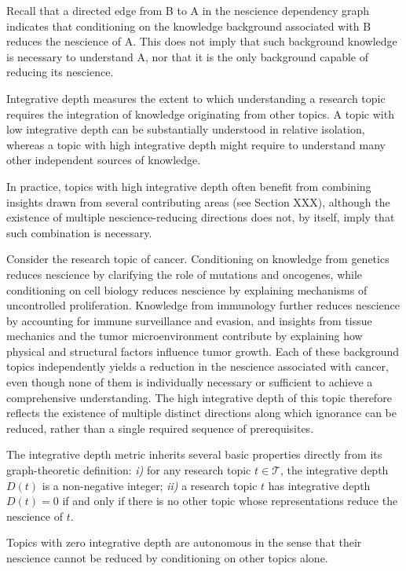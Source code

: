\noindent
Recall that a directed edge from B to A in the nescience dependency graph indicates that conditioning on the knowledge background associated with B reduces the nescience of A. This does not imply that such background knowledge is necessary to understand A, nor that it is the only background capable of reducing its nescience.

Integrative depth measures the extent to which understanding a research topic requires the integration of knowledge originating from other topics. A topic with low integrative depth can be substantially understood in relative isolation, whereas a topic with high integrative depth might require to understand many other independent sources of knowledge.

In practice, topics with high integrative depth often benefit from combining insights drawn from several contributing areas (see Section XXX), although the existence of multiple nescience-reducing directions does not, by itself, imply that such combination is necessary.

\begin{example}
Consider the research topic of cancer. Conditioning on knowledge from genetics reduces nescience by clarifying the role of mutations and oncogenes, while conditioning on cell biology reduces nescience by explaining mechanisms of uncontrolled proliferation. Knowledge from immunology further reduces nescience by accounting for immune surveillance and evasion, and insights from tissue mechanics and the tumor microenvironment contribute by explaining how physical and structural factors influence tumor growth. Each of these background topics independently yields a reduction in the nescience associated with cancer, even though none of them is individually necessary or sufficient to achieve a comprehensive understanding. The high integrative depth of this topic therefore reflects the existence of multiple distinct directions along which ignorance can be reduced, rather than a single required sequence of prerequisites.
\end{example}

The integrative depth metric inherits several basic properties directly from its graph-theoretic definition: \emph{i)} for any research topic $t \in \mathcal{T}$, the integrative depth $D(t)$ is a non-negative integer; \emph{ii)} a research topic $t$ has integrative depth $D(t) = 0$ if and only if there is no other topic whose representations reduce the nescience of $t$.

Topics with zero integrative depth are autonomous in the sense that their nescience cannot be reduced by conditioning on other topics alone.

